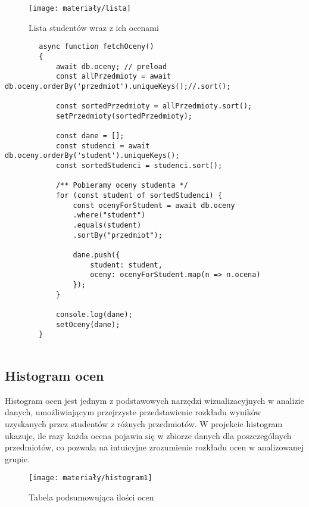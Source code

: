 \begin{figure}[ht]
	\centering
	\texttt{[image: materiały/lista]}
	\caption{Lista studentów wraz z ich ocenami}
\end{figure}

\newpage
\begin{empty}
	\begin{verbatim}
		async function fetchOceny() 
		{
			await db.oceny; // preload
			const allPrzedmioty = await db.oceny.orderBy('przedmiot').uniqueKeys();//.sort();
			
			const sortedPrzedmioty = allPrzedmioty.sort();
			setPrzedmioty(sortedPrzedmioty);
			
			const dane = [];
			const studenci = await db.oceny.orderBy('student').uniqueKeys();
			const sortedStudenci = studenci.sort();
			
			/** Pobieramy oceny studenta */
			for (const student of sortedStudenci) {
				const ocenyForStudent = await db.oceny
				.where("student")
				.equals(student)
				.sortBy("przedmiot");
				
				dane.push({
					student: student,
					oceny: ocenyForStudent.map(n => n.ocena)
				});
			}
			
			console.log(dane);
			setOceny(dane);
		}
		
	\end{verbatim}
	\vspace{-10pt}
\end{empty}


\subsection{Histogram ocen}
Histogram ocen jest jednym z podstawowych narzędzi wizualizacyjnych w analizie danych, umożliwiającym przejrzyste przedstawienie rozkładu wyników uzyskanych przez studentów z różnych przedmiotów. W projekcie histogram ukazuje, ile razy każda ocena pojawia się w zbiorze danych dla poszczególnych przedmiotów, co pozwala na intuicyjne zrozumienie rozkładu ocen w analizowanej grupie.
\newpage
\begin{figure}[ht]
	\centering
	\texttt{[image: materiały/histogram1]}
	\caption{Tabela podsumowująca ilości ocen}
\end{figure}

